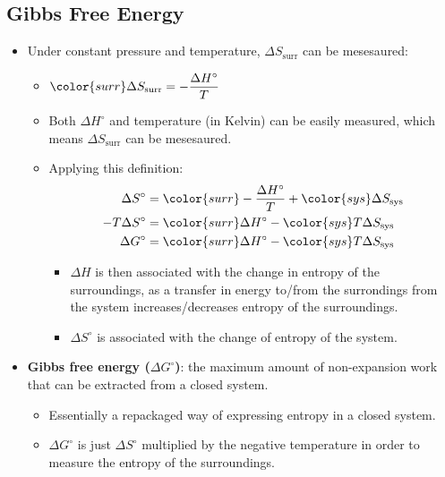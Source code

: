 \documentclass[12pt,a4paper]{article}
\begin{document}
\subsection{Gibbs Free Energy}
\begin{itemize}
    \item Under constant pressure and temperature, {\color{surr}\(\Delta S_{\text{surr}}\)} can be mesesaured:
        \begin{itemize}
            \item \({\color{surr}\Delta S_{\text{surr}}} = -\dfrac{\Delta H^\circ}{T}\) 
            \item Both \(\Delta H^\circ\) and temperature (in Kelvin) can be easily measured, which means {\color{surr}\(\Delta S_{\text{surr}}\)} can be mesesaured.
            \item Applying this definition:
            \begin{align*}
                    \Delta S^\circ &= {\color{surr}-\dfrac{\Delta H^\circ}{T}} + \color{sys}\Delta S_{\text{sys}}\\
                    -T\Delta S^\circ &= {\color{surr}\Delta H^\circ} - \color{sys}T\Delta S_{\text{sys}}\\
                    \Delta G^\circ &= {\color{surr}\Delta H^\circ} - {\color{sys}T\Delta S_{\text{sys}}}
            \end{align*}
            \begin{itemize}
                \item \(\Delta H\) is then associated with {\color{o-Sun}the change in entropy of the surroundings}, as a transfer in energy to/from the surrondings from the system increases/decreases entropy of the surroundings.
                \item \(\Delta S^\circ\) is associated with {\color{o-Sun}the change of entropy of the system}. 
            \end{itemize}
        \end{itemize}
    \item \textbf{Gibbs free energy (\(\Delta G^\circ\))}: the maximum amount of non-expansion work that can be extracted from a closed system.
        \begin{itemize}
            \item Essentially a repackaged way of expressing entropy in a closed system.
            \item \(\Delta G^\circ\) is just \(\Delta S^\circ\) multiplied by the negative temperature in order to measure the entropy of the surroundings.

\end{itemize}
\end{itemize}
\end{document}

